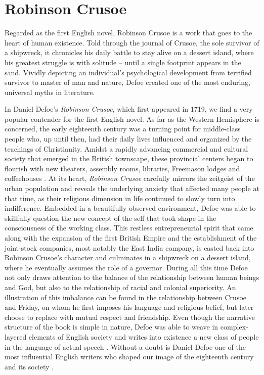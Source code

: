 \section{Robinson Crusoe}

\begin{displayquote}
Regarded as the first English novel, Robinson Crusoe is a work that goes to the 
heart of human existence. Told through the journal of Crusoe, the sole survivor 
of a shipwreck, it chronicles his daily battle to stay alive on a dessert 
island, where his greatest struggle is with solitude – until a single footprint 
appears in the sand. Vividly depicting an individual’s psychological development 
from terrified survivor to master of man and nature, Defoe created one of the 
most enduring, universal myths in literature. \autocite{defoe2012}
\end{displayquote}

In Daniel Defoe’s \emph{Robinson Crusoe}, which first appeared in 1719, we find 
a very popular contender for the first English novel. As far as the Western 
Hemisphere is concerned, the early eighteenth century was a turning point for 
middle-class people who, up until then, had their daily lives influenced and 
organized by the teachings of Christianity. Amidst a rapidly advancing 
commercial and cultural society that emerged in the British townscape, these 
provincial centers began to flourish with new theaters, assembly rooms, 
libraries, Freemason lodges and coffeehouses \autocite{britannica2020}. At its 
heart, \emph{Robinson Crusoe} carefully mirrors the zeitgeist of the urban 
population and reveals the underlying anxiety that affected many people at that 
time, as their religious dimension in life continued to slowly turn into 
indifference. Embedded in a beautifully observed environment, Defoe was able to 
skillfully question the new concept of the self that took shape in the 
consciousness of the working class. This restless entrepreneurial spirit that 
came along with the expansion of the first British Empire and the establishment 
of the joint-stock companies, most notably the East India company, is casted 
back into Robinson Crusoe’s character and culminates in a shipwreck on a dessert 
island, where he eventually assumes the role of a governor. During all this time 
Defoe not only draws attention to the balance of the relationship between human 
beings and God, but also to the relationship of racial and colonial superiority. 
An illustration of this imbalance can be found in the relationship between 
Crusoe and Friday, on whom he first imposes his language and religious belief, 
but later choose to replace with mutual respect and friendship. Even though the 
narrative structure of the book is simple in nature, Defoe was able to weave in 
complex-layered elements of English society and writes into existence a new 
class of people in the language of actual speech \autocite[187]{peckCoyle2002}. 
Without a doubt is Daniel Defoe one of the most influential English writers who 
shaped our image of the eighteenth century and its society 
\autocite[2289]{greenblatt2006}.
